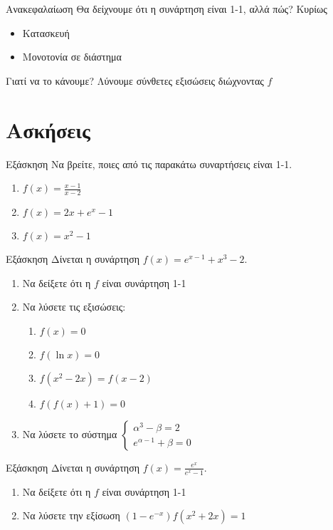 \documentclass[greek]{beamer}
\begin{document}
\begin{frame}{Ανακεφαλαίωση}
 Θα δείχνουμε ότι η συνάρτηση είναι 1-1, αλλά πώς? \pause
 Κυρίως
 \begin{itemize}
  \item Κατασκευή \pause
  \item Μονοτονία σε διάστημα
 \end{itemize} \pause
 \begin{alertblock}{Γιατί να το κάνουμε?}
  Λύνουμε σύνθετες εξισώσεις διώχνοντας $f$
 \end{alertblock}
\end{frame}

\section{Ασκήσεις}
\begin{frame}{Εξάσκηση}
 Να βρείτε, ποιες από τις  παρακάτω συναρτήσεις είναι 1-1.
 \begin{enumerate}
  \item $f(x)=\frac{x-1}{x-2}$\pause
  \item $f(x)=2x+e^x-1$\pause
  \item $f(x)=x^2-1$
 \end{enumerate}
\end{frame}

\begin{frame}{Εξάσκηση}
 Δίνεται η συνάρτηση $f(x)=e^{x-1}+x^3-2$.
 \begin{enumerate}
  \item Να δείξετε ότι η $f$ είναι συνάρτηση 1-1 \pause
  \item Να λύσετε τις εξισώσεις:
        \begin{enumerate}
         \item $f(x)=0$ \pause
         \item $f(\ln x)=0$ \pause
         \item $f(x^2-2x)=f(x-2)$ \pause
         \item $f\left(f(x)+1\right)=0$ \pause
        \end{enumerate}
  \item Να λύσετε το σύστημα $\begin{cases}
          α^3-β=2 \\
          e^{α-1}+β=0
         \end{cases}$
 \end{enumerate}
\end{frame}

\begin{frame}{Εξάσκηση}
 Δίνεται η συνάρτηση $f(x)=\frac{e^x}{e^x-1}$.
 \begin{enumerate}
  \item Να δείξετε ότι η $f$ είναι συνάρτηση 1-1 \pause
  \item Να λύσετε την εξίσωση $(1-e^{-x})f(x^2+2x)=1$
 \end{enumerate}
\end{frame}
\end{document}

